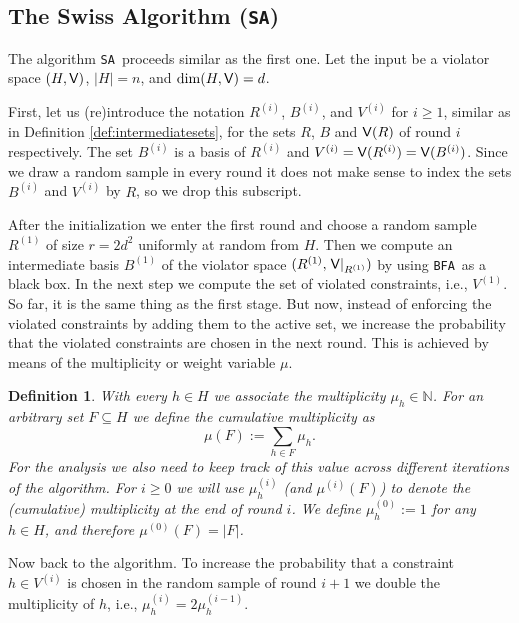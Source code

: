 \documentclass[12pt]{article}
\def\Violators{{\sf V}}
\newtheorem{definition2}[theorem2]{Definition}
\newenvironment{definition}{\begin{definition2}}{\end{definition2}}
\theoremstyle{remark}
\def\stageII{\texttt{SA}}
\def\stageIII{\texttt{BFA}}
\begin{document}
\subsection{The Swiss Algorithm (\stageII)}
\label{subsec:secondstage}

The algorithm \stageII~proceeds similar as the first one.
Let the input be a violator space $(H,\Violators)$, $|H|=n$, and $\dim(H,\Violators)=d$.

First, let us 
(re)introduce the notation $R^{(i)}$, $B^{(i)}$, and $V^{(i)}$ for $i\geq 1$, similar as in 
Definition \ref{def:intermediatesets}, for the sets $R$, $B$ and $\Violators(R)$ of round $i$
respectively. The set $B^{(i)}$ is a basis of $R^{(i)}$ and $V^{(i)}=\Violators(R^{(i)})=
\Violators(B^{(i)})$.
Since we draw a random sample in every round it does not make sense to index the sets
$B^{(i)}$ and $V^{(i)}$ by $R$, so we drop this subscript.

After the initialization we enter the first round and choose a random sample $R^{(1)}$ of size
$r=2 d^2$ uniformly at random from $H$. Then we compute an intermediate basis $B^{(1)}$
of the violator space  $(R^{(1)},\left.\Violators\right|_{R^{(1)}})$ by using \stageIII~as
a black box. 
In the next step we compute the set of violated constraints, i.e., $V^{(1)}$.
So far, it is the same thing as the first stage. But now, instead of enforcing the violated
constraints by adding them to the active set, we increase the probability that the violated
constraints are chosen in the next round. This is achieved by means of the multiplicity
or weight variable $\mu$.

    \begin{definition}
\label{def:intermediatemultiplicities}
With every $h\in H$ we associate the \emph{multiplicity} $\mu_h\in\mathbb{N}$. For an arbitrary
set $F\subseteq H$ we define the \emph{cumulative multiplicity} as
\[
	\mu(F):= \sum_{h\in F} \mu_h.
\]
For the analysis we also need to keep track of this value across different iterations
of the algorithm. For $i\geq 0$ we will use $\mu^{(i)}_h$ (and
$\mu^{(i)}(F)$) to denote the (cumulative) multiplicity at the end of round $i$.
We define $\mu_h^{(0)}:= 1$ for any $h \in H$,
and therefore $\mu^{(0)}(F)=|F|$.
\end{definition}

Now back to the algorithm. To increase the probability that a constraint $h\in V^{(i)}$ is chosen in the
random sample of round $i+1$ we double the multiplicity of $h$,
i.e., $\mu^{(i)}_h = 2\mu^{(i-1)}_h$.
\end{document}
